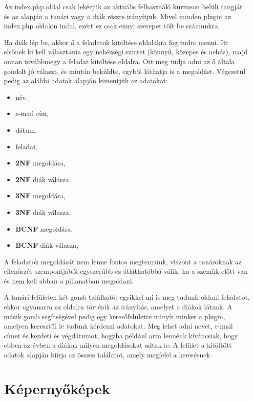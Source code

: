 Az index.php oldal csak lekérjük az aktuális felhasználó kurzuson belüli rangját és az alapján a tanári vagy a diák részre irányítjuk. Mivel minden plugin az index.php oldalon indul, ezért ez csak ennyi szerepet tölt be számunkra. \par
Ha diák lép be, akkor ő a feladatok kitöltése oldalakra fog tudni menni. Itt elsőnek ki kell választania egy nehézségi szintet (könnyű, közepes és nehéz), majd onnan továbbmegy a feladat kitöltése oldalra. Ott meg tudja adni az ő általa gondolt jó választ, és miután beküldte, egyből láthatja is a megoldást. Végezetül pedig az alábbi adatok alapján kimentjük az adatokat:
\begin{itemize}
    \item név,
    \item e-mail cím,
    \item dátum,
    \item feladat,
    \item \textbf{2NF} megoldása,
    \item \textbf{2NF} diák válasza,
    \item \textbf{3NF} megoldása,
    \item \textbf{3NF} diák válasza,
    \item \textbf{BCNF} megoldása,
    \item \textbf{BCNF} diák válasza,
\end{itemize}

A feladatok megoldását nem lenne fontos megtennünk, viszont a tanároknak az ellenőrzés szempontjából egyszerűbb és átláthatóbbá válik, ha a szemük előtt van és nem kell abban a pillanatban megoldani. \par

A tanári felületen két gomb található: egyikkel mi is meg tudunk oldani feladatot, ekkor ugyanarra az oldalra történik az irányítás, amelyet a diákok látnak. A másik gomb segítségével pedig egy keresőfelületre irányít minket a plugin, amelyen keresztül le tudunk kérdezni adatokat. Meg lehet adni nevet, e-mail címet és kezdeti és végdátumot, hogyha például arra lennénk kíváncsiak, hogy ebben az évben a diákok milyen megoldásokat adtak le. A felület a kitöltött adatok alapján kiírja az összes találatot, amely megfelel a keresésnek.

\section{Képernyőképek}

